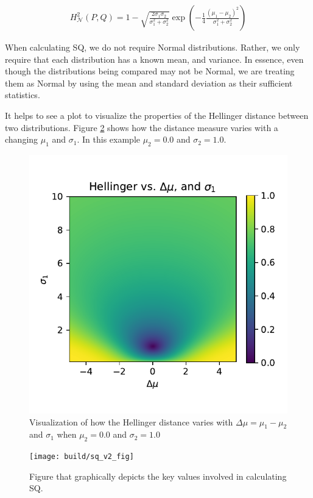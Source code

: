 \begin{align}
    H_{\mathcal{N}}^{2}(P,Q) = 1-\sqrt{\frac{2\sigma_1\sigma_2}{\sigma_1^2+\sigma_2^2}}\exp{\left(-\frac{1}{4}\frac{(\mu_1-\mu_2)^2}{\sigma_1^2+\sigma_2^2}\right)}
\end{align}

When calculating SQ, we do not require Normal distributions. Rather, we only require that each distribution has a known mean, and variance. In essence, even though the distributions being compared may not be Normal, we are treating them as Normal by using the mean and standard deviation as their sufficient statistics.

It helps to see a plot to visualize the properties of the Hellinger distance between two distributions. Figure \ref{fig:hellinger_surf} shows how the distance measure varies with a changing $\mu_1$ and $\sigma_1$. In this example $\mu_2=0.0$ and $\sigma_2=1.0$.

\begin{figure}[tbp]
    \centering
    \includegraphics[width=0.9\linewidth]{Figures/hellinger_surf}
    \caption{Visualization of how the Hellinger distance varies with $\Delta\mu=\mu_1-\mu_2$ and $\sigma_1$ when $\mu_2=0.0$ and $\sigma_2=1.0$}
    \label{fig:hellinger_surf}
\end{figure}
\begin{figure}[tbp]
    \centering
    \texttt{[image: build/sq\_v2\_fig]}
    \caption{Figure that graphically depicts the key values involved in calculating SQ.}
    \label{fig:hellinger_surf}
\end{figure}

